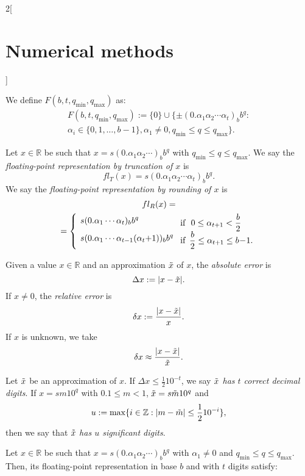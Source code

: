 \documentclass[class=article,10pt,crop=false]{standalone}
\begin{document}
\begin{multicols}{2}[\section{Numerical methods}]
\begin{table}[ht]
\end{table}
\begin{definition}
We define $F(b,t,q_\text{min},q_\text{max})$ as:
\begin{multline*}
    F(b,t,q_\text{min},q_\text{max}):=\{0\}\cup\{\pm(0.\alpha_1\alpha_2\cdots\alpha_t)_bb^q:\\\alpha_i\in\{0,1,\ldots,b-1\},\alpha_1\ne0, q_\text{min}\leq q\leq q_\text{max}\}.
\end{multline*}
\end{definition}
\begin{definition}
Let $x\in\mathbb{R}$ be such that $x=s(0.\alpha_1\alpha_2\cdots)_bb^q$ with $q_\text{min}\leq q\leq q_\text{max}$. We say the \textit{floating-point representation by truncation of $x$} is $$fl_T(x)=s(0.\alpha_1\alpha_2\cdots\alpha_t)_bb^q.$$ We say the \textit{floating-point representation by rounding of $x$} is
\begin{multline*}
fl_R(x)=\\=\left\{\text{\setlength{\tabcolsep}{4pt}\begin{tabular}{m{3.85cm}m{3cm}}
        $s(0.\alpha_1\cdots\alpha_t)_bb^q$ & if $\ 0\leq\alpha_{t+1}<\frac{b}{2}$\\
        $s(0.\alpha_1\cdots\alpha_{t-1}(\alpha_t+1))_bb^q$ & if $\ \frac{b}{2}\leq\alpha_{t+1}\leq b-1.$
    \end{tabular}}\right.
\end{multline*}
\end{definition}
\begin{definition}
Given a value $x\in\mathbb{R}$ and an approximation $\Tilde{x}$ of $x$, the \textit{absolute error} is $$\Delta x:=|x-\Tilde{x}|.$$ If $x\ne 0$, the \textit{relative error} is $$\delta x:=\frac{|x-\Tilde{x}|}{x}.$$ If $x$ is unknown, we take $$\delta x\approx\frac{|x-\Tilde{x}|}{\Tilde{x}}.$$
\end{definition}
\begin{definition}
Let $\Tilde{x}$ be an approximation of $x$. If $\Delta x\leq\frac{1}{2}10^{-t}$, we say \textit{$\Tilde{x}$ has $t$ correct decimal digits}. If $x=sm10^q$ with $0.1\leq m<1$, $\Tilde{x}=s\Tilde{m}10^q$ and $$u:=\max\{i\in\mathbb{Z}:|m-\Tilde{m}|\leq\frac{1}{2}10^{-i}\},$$ then we say that $\Tilde{x}$ \textit{has $u$ significant digits}.
\end{definition}
\begin{prop}
Let $x\in\mathbb{R}$ be such that $x=s(0.\alpha_1\alpha_2\cdots)_bb^q$ with $\alpha_1\ne0$ and $q_\text{min}\leq q\leq q_\text{max}$. Then, its floating-point representation in base $b$ and with $t$ digits satisfy:

\end{prop}
\end{multicols}
\end{document}
